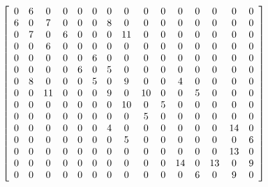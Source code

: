 \documentclass[12pt]{article}
\begin{document}
    \[
        \left[
            \begin{array}{*{15}c}
                0 & 6 & 0 & 0 & 0 & 0 & 0 & 0 & 0 & 0 & 0 & 0 & 0 & 0 & 0 \\
                6 & 0 & 7 & 0 & 0 & 0 & 8 & 0 & 0 & 0 & 0 & 0 & 0 & 0 & 0 \\
                0 & 7 & 0 & 6 & 0 & 0 & 0 & 11 & 0 & 0 & 0 & 0 & 0 & 0 & 0 \\
                0 & 0 & 6 & 0 & 0 & 0 & 0 & 0 & 0 & 0 & 0 & 0 & 0 & 0 & 0 \\
                0 & 0 & 0 & 0 & 0 & 6 & 0 & 0 & 0 & 0 & 0 & 0 & 0 & 0 & 0 \\
                0 & 0 & 0 & 0 & 6 & 0 & 5 & 0 & 0 & 0 & 0 & 0 & 0 & 0 & 0 \\
                0 & 8 & 0 & 0 & 0 & 5 & 0 & 9 & 0 & 0 & 4 & 0 & 0 & 0 & 0 \\
                0 & 0 & 11 & 0 & 0 & 0 & 9 & 0 & 10 & 0 & 0 & 5 & 0 & 0 & 0 \\
                0 & 0 & 0 & 0 & 0 & 0 & 0 & 10 & 0 & 5 & 0 & 0 & 0 & 0 & 0 \\
                0 & 0 & 0 & 0 & 0 & 0 & 0 & 0 & 5 & 0 & 0 & 0 & 0 & 0 & 0 \\
                0 & 0 & 0 & 0 & 0 & 0 & 4 & 0 & 0 & 0 & 0 & 0 & 0 & 14 & 0 \\
                0 & 0 & 0 & 0 & 0 & 0 & 0 & 5 & 0 & 0 & 0 & 0 & 0 & 0 & 6 \\
                0 & 0 & 0 & 0 & 0 & 0 & 0 & 0 & 0 & 0 & 0 & 0 & 0 & 13 & 0 \\
                0 & 0 & 0 & 0 & 0 & 0 & 0 & 0 & 0 & 0 & 14 & 0 & 13 & 0 & 9 \\
                0 & 0 & 0 & 0 & 0 & 0 & 0 & 0 & 0 & 0 & 0 & 6 & 0 & 9 & 0 \\
            \end{array}
        \right]
    \]
    \newpage
\end{document}
